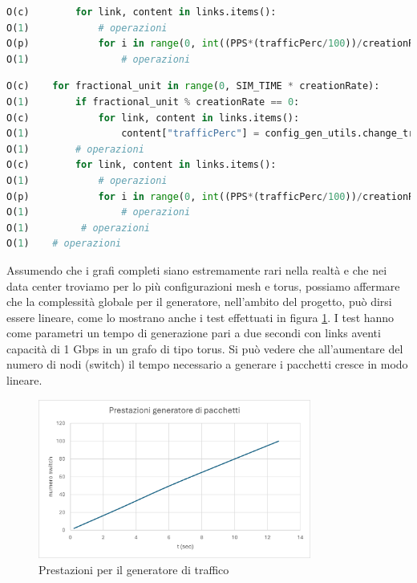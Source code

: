 \documentclass[binding=0.6cm]{sapthesis}
\begin{document}
{\scriptsize
\begin{lstlisting}[language=Python, basicstyle=\ttfamily, caption={Complessità per numero di links di un grafo completo}, label={codice:create_packets_n_links}, breaklines=true]
O(c)        for link, content in links.items():
O(1)            # operazioni
O(p)            for i in range(0, int((PPS*(trafficPerc/100))/creationRate)):
O(1)                # operazioni  
\end{lstlisting}
}


{\scriptsize
\begin{lstlisting}[language=Python, basicstyle=\ttfamily, caption={Complessità della logica di creazione pacchetti}, label={codice:create_packets_complexity}, breaklines=true]
O(c)    for fractional_unit in range(0, SIM_TIME * creationRate):
O(1)        if fractional_unit % creationRate == 0:
O(c)            for link, content in links.items():
O(1)                content["trafficPerc"] = config_gen_utils.change_traffic_perc(content["trafficPerc"], setup["trafficVariation"])
O(1)        # operazioni
O(c)        for link, content in links.items():
O(1)            # operazioni
O(p)            for i in range(0, int((PPS*(trafficPerc/100))/creationRate)):
O(1)                # operazioni
O(1)         # operazioni
O(1)    # operazioni
\end{lstlisting}
}

Assumendo che i grafi completi siano estremamente rari nella realtà e che nei data center troviamo per lo più configurazioni mesh e torus, possiamo
affermare che la complessità globale per il generatore, nell'ambito del progetto, può dirsi essere lineare, come lo mostrano anche i test effettuati in figura \ref{fig:prestazioni_config_gen}.
I test hanno come parametri un tempo di generazione pari a due secondi con links aventi capacità di 1 Gbps in un grafo di tipo torus.
Si può vedere che all'aumentare del numero di nodi (switch) il tempo necessario a generare i pacchetti cresce in modo lineare.

\begin{figure}[h]
    \centering
    \includegraphics[width=0.8\textwidth]{immagini/prestazioni_config_gen.png}
    \caption{Prestazioni per il generatore di traffico}
    \label{fig:prestazioni_config_gen}
\end{figure}
\end{document}
